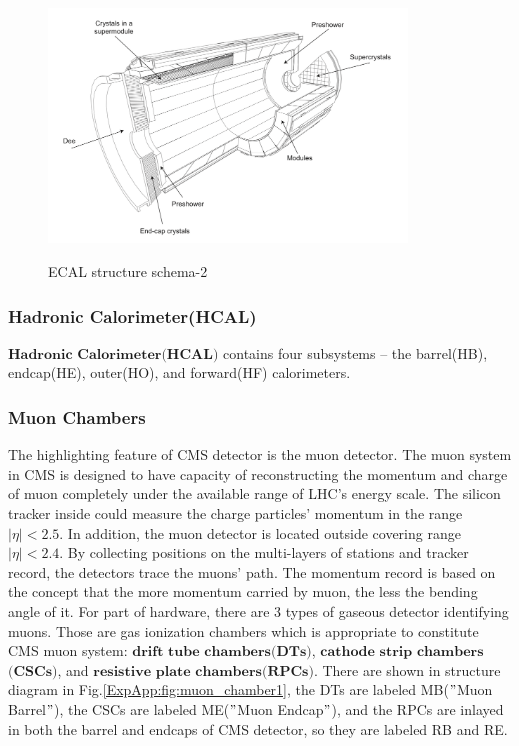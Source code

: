 			\begin{figure}[H]
			\centering{}
		    	\includegraphics[width=0.85\textwidth]{Figures/ExpApparatus/ECAL2.png}\\
			\caption{ECAL structure schema-2\cite{ECAL_ex}}
			\label{ExpApp:fig:ECAL2}
			\end{figure}
			\FloatBarrier

		\subsubsection{Hadronic Calorimeter(HCAL)}
		\label{sssec:hcal}

			$\textbf{Hadronic Calorimeter(HCAL)}$ contains four subsystems -- the barrel(HB), endcap(HE), outer(HO), and forward(HF) calorimeters.
			\cite{Canko_ak_2009}
			\cite{collaboration_2012}

		\subsubsection{Muon Chambers}
		\label{sssec:muon_detector}

			The highlighting feature of CMS detector is the muon detector. The muon system in CMS is designed to have capacity of reconstructing the momentum and charge of muon completely under the available range of LHC's energy scale. The silicon tracker inside could measure the charge particles' momentum in the range $|\eta|<2.5$. In addition, the muon detector is located outside covering range $|\eta|<2.4$. By collecting positions on the multi-layers of stations and tracker record, the detectors trace the muons' path. The momentum record is based on the concept that the more momentum carried by muon, the less the bending angle of it. For part of hardware, there are 3 types of gaseous detector identifying muons. Those are gas ionization chambers which is appropriate to constitute CMS muon system: $\textbf{drift}$ $\textbf{tube}$ $\textbf{chambers}$$\textbf{(DTs)}$, $\textbf{cathode}$ $\textbf{strip}$ $\textbf{chambers}$$\textbf{(CSCs)}$, and $\textbf{resistive}$ $\textbf{plate}$ $\textbf{chambers}$$\textbf{(RPCs)}$. There are shown in structure diagram in Fig.\ref{ExpApp:fig:muon_chamber1}, the DTs are labeled MB($"$Muon Barrel$"$), the CSCs are labeled ME($"$Muon Endcap$"$), and the RPCs are inlayed in both the barrel and endcaps of CMS detector, so they are labeled RB and RE.

